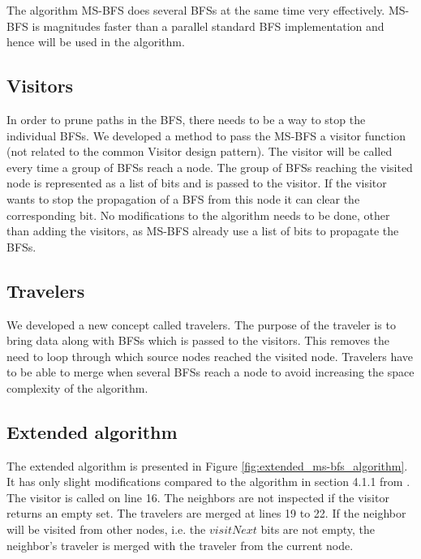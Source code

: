 The algorithm MS-BFS \cite{msbfs} does several BFSs at the same time very effectively. MS-BFS is magnitudes faster than a parallel standard BFS implementation and hence will be used in the algorithm. 

\subsection{Visitors}
In order to prune paths in the BFS, there needs to be a way to stop the individual BFSs. We developed a method to pass the MS-BFS a visitor function (not related to the common Visitor design pattern). The visitor will be called every time a group of BFSs reach a node. The group of BFSs reaching the visited node is represented as a list of bits and is passed to the visitor. If the visitor wants to stop the propagation of a BFS from this node it can clear the corresponding bit. No modifications to the algorithm needs to be done, other than adding the visitors, as MS-BFS already use a list of bits to propagate the BFSs.

\subsection{Travelers}
We developed a new concept called travelers. The purpose of the traveler is to bring data along with BFSs which is passed to the visitors. This removes the need to loop through which source nodes reached the visited node. Travelers have to be able to merge when several BFSs reach a node to avoid increasing the space complexity of the algorithm. 

\subsection{Extended algorithm}

The extended algorithm is presented in Figure \ref{fig:extended_ms-bfs_algorithm}. It has only slight modifications compared to the algorithm in section 4.1.1 from \cite{msbfs}. The visitor is called on line 16. The neighbors are not inspected if the visitor returns an empty set. The travelers are merged at lines 19 to 22. If the neighbor will be visited from other nodes, i.e. the $visitNext$ bits are not empty, the neighbor's traveler is merged with the traveler from the current node.

